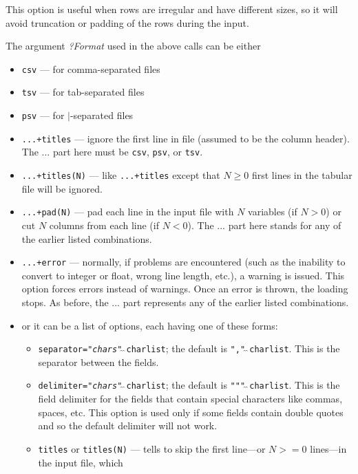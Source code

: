 \begin{itemize}
    This option is useful when rows are irregular and
    have different sizes, so it will avoid
    truncation or padding of the rows during the input.
\end{itemize}

The argument \emph{?Format} used in the above calls can be either
\begin{itemize}
\item \texttt{csv} --- for comma-separated files
\item \texttt{tsv} --- for tab-separated files
\item \texttt{psv} --- for $\mid$-separated files
\item \texttt{...+titles} --- ignore the first line in file (assumed
  to be the column header). The ... part here must be \texttt{csv},
  \texttt{psv}, or \texttt{tsv}.   
\item \texttt{...+titles(N)} --- like \texttt{...+titles} except that
  $N\geq 0$ first lines in the tabular file will be ignored.
\item \texttt{...+pad(N)} --- pad each line in the input file with $N$
  variables (if $N>0$) or cut $N$ columns from each line (if $N<0$).
  The ... part here stands for any of the earlier listed combinations.
\item \texttt{...+error} --- normally, if problems are encountered (such as
  the inability to convert to integer or float, wrong line length, etc.),
  a warning is issued. This option forces errors instead of warnings. Once
  an error is thrown, the loading stops. As before, the ... part represents any of
  the earlier listed combinations.
\item or it can be a list of options, each having one of these forms:
\begin{itemize}
\item  \texttt{separator="\textnormal{\emph{chars}}"$\hat{~}\hat{~}$\bs{}charlist}; the default is
  \texttt{","$\hat{~}\hat{~}$\bs{}charlist}. This is the separator between the fields.
\item 
  \texttt{delimiter="\textnormal{\emph{chars}}"$\hat{~}\hat{~}$\bs{}charlist}; the
  default is \texttt{"\bs{}""$\hat{~}\hat{~}$\bs{}charlist}. This is the field delimiter
  for the fields that contain special characters like commas, spaces, etc.
  This option is used only if some fields contain double quotes and so the
  default delimiter will not work.
\item \texttt{titles} or \texttt{titles(N)} --- tells to skip the first
  line---or $N>=0$ lines---in the input file, which 

\end{itemize}
\end{itemize}
